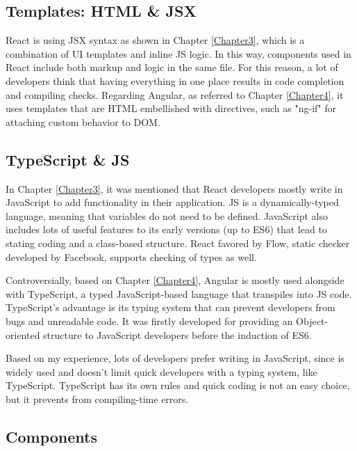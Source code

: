 \subsection{Templates: HTML \& JSX}

React is using JSX syntax as shown in Chapter \ref{Chapter3}, which is a combination of UI templates and inline JS logic. In this way, components used in React include both markup and logic in the same file. For this reason, a lot of developers think that having everything in one place results in code completion and compiling checks. Regarding Angular, as referred to Chapter \ref{Chapter4}, it uses templates that are HTML embellished with directives, such as "ng-if" for attaching custom behavior to DOM. \par

\subsection{TypeScript \& JS}

In Chapter \ref{Chapter3}, it was mentioned that React developers mostly write in JavaScript to add functionality in their application. JS is a dynamically-typed language, meaning that variables do not need to be defined. JavaScript also includes lots of useful features to its early versions (up to ES6) that lead to stating coding and a class-based structure. React favored by Flow, static checker developed by Facebook, supports checking of types as well. \par

Controversially, based on Chapter \ref{Chapter4}, Angular is mostly used alongside with TypeScript, a typed JavaScript-based language that transpiles into JS code. TypeScript's advantage is its typing system that can prevent developers from bugs and unreadable code. It was firstly developed for providing an Object-oriented structure to JavaScript developers before the induction of ES6. \par

Based on my experience, lots of developers prefer writing in JavaScript, since is widely used and doesn't limit quick developers with a typing system, like TypeScript. TypeScript has its own rules and quick coding is not an easy choice, but it prevents from compiling-time errors. \par

\subsection{Components}

